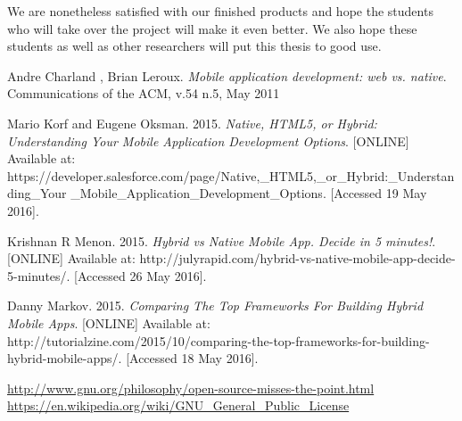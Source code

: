 \documentclass{eplmastersthesis}
\begin{document}
We are nonetheless satisfied with our finished products and hope the students who will take over the project will make it even better. We also hope these students as well as other researchers will put this thesis to good use.\\
\begin{thebibliography}{9}

\bibitem{} 
Andre Charland , Brian Leroux.
\textit{Mobile application development: web vs. native}. 
Communications of the ACM, v.54 n.5, May 2011  

\bibitem{} 
Mario Korf and Eugene Oksman. 2015.
\textit{Native, HTML5, or Hybrid: Understanding Your Mobile Application Development Options}.
[ONLINE] Available at: https://developer.salesforce.com/page/Native,\_HTML5,\_or\_Hybrid:\_Understanding\_Your
\_Mobile\_Application\_Development\_Options. [Accessed 19 May 2016].


\bibitem{} 
Krishnan R Menon. 2015.
\textit{Hybrid vs Native Mobile App. Decide in 5 minutes!}.
[ONLINE] Available at: http://julyrapid.com/hybrid-vs-native-mobile-app-decide-5-minutes/. [Accessed 26 May 2016].
 
\bibitem{} 
Danny Markov. 2015.
\textit{Comparing The Top Frameworks For Building Hybrid Mobile Apps}.
[ONLINE] Available at: http://tutorialzine.com/2015/10/comparing-the-top-frameworks-for-building-hybrid-mobile-apps/. [Accessed 18 May 2016].

\end{thebibliography}
\url{http://www.gnu.org/philosophy/open-source-misses-the-point.html}\\
\url{https://en.wikipedia.org/wiki/GNU_General_Public_License}\\

\backcoverpage
\end{document}
